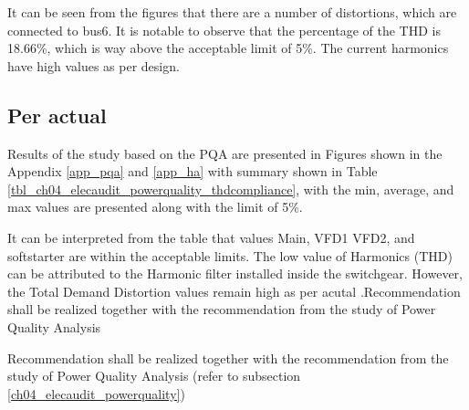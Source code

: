 It can be seen from the figures that there are a number of distortions, which are connected to bus6. It is notable to observe that the percentage of the THD is 18.66\%, which is way above the acceptable limit of 5\%. The current harmonics have high values as per design.


\subsection{Per actual}
Results of the study based on the PQA are presented in Figures shown in the Appendix \ref{app_pqa} and \ref{app_ha} with summary shown in Table \ref{tbl_ch04_elecaudit_powerquality_thdcompliance}, with the min, average, and max values are presented along with the limit of 5\%.


%

It can be interpreted from the table that values Main, VFD1 VFD2, and softstarter  are within the acceptable limits. The low value of Harmonics (THD)  can be attributed to the Harmonic filter installed inside the switchgear. However, the Total Demand Distortion values remain high as per acutal .Recommendation shall be realized together with the recommendation from the study of Power Quality Analysis 

Recommendation shall be realized together with the recommendation from the study of Power Quality Analysis (refer to subsection \ref{ch04_elecaudit_powerquality})



